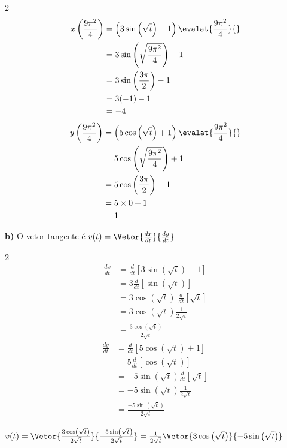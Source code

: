\documentclass[a4paper,12pt,fleqn]{article}
\begin{document}
\begin{answer}
\begin{multicols}{2}
\begin{align*}
  x\left(\frac{9\pi^2}{4}\right)
  & = \left(3 \sin\left(\sqrt{t}\right) - 1\right) \evalat{\frac{9\pi^2}{4}}{} \\
  & = 3 \sin\left(\sqrt{\frac{9\pi^2}{4}}\right) - 1  \\
  & = 3 \sin\left(\frac{3\pi}{2}\right) - 1  \\
  & = 3 (-1) - 1  \\
  & = -4
\end{align*}
\newcolumn
\begin{align*}
  y\left(\frac{9\pi^2}{4}\right)
  & = \left(5 \cos\left(\sqrt{t}\right) + 1\right) \evalat{\frac{9\pi^2}{4}}{} \\
  & = 5 \cos\left(\sqrt{\frac{9\pi^2}{4}}\right) + 1 \\
  & = 5 \cos\left(\frac{3\pi}{2}\right) + 1 \\
  & = 5 \times 0 + 1 \\
  & = 1
\end{align*}
\end{multicols}


\textbf{b)} \quad
O vetor tangente é
\(
  v(t) = \Vetor{\frac{dx}{dt}}{\frac{dy}{dt}}
\)

\begin{multicols}{2}
\begin{align*}
  \frac{dx}{dt}
  & = \frac{d}{dt}\left[3 \sin\left(\sqrt{t}\right) - 1\right] \\[2mm]
  & = 3 \frac{d}{dt}\left[\sin\left(\sqrt{t}\right)\right] \\[2mm]
  & = 3 \cos\left(\sqrt{t}\right)\;\frac{d}{dt}\left[\sqrt{t}\right] \\[2mm]
  & = 3 \cos\left(\sqrt{t}\right)\frac{1}{2\sqrt{t}} \\[2mm]
  & = \frac{3 \cos\left(\sqrt{t}\right)}{2\sqrt{t}}
\end{align*}
\newcolumn
\begin{align*}
  \frac{dy}{dt}
  & = \frac{d}{dt}\left[5 \cos\left(\sqrt{t}\right) + 1\right]   \\[2mm]
  & = 5\frac{d}{dt}\left[\cos\left(\sqrt{t}\right)\right]   \\[2mm]
  & = -5\sin\left(\sqrt{t}\right)\frac{d}{dt}\left[\sqrt{t}\right]   \\[2mm]
  & = -5\sin\left(\sqrt{t}\right)\frac{1}{2\sqrt{t}} \\[2mm]
  & = \frac{-5\sin\left(\sqrt{t}\right)}{2\sqrt{t}}
\end{align*}
\end{multicols}
\(
  v(t)
  = \Vetor%
    {\frac{3 \cos\left(\sqrt{t}\right)}{2\sqrt{t}}}
    {\frac{-5\sin\left(\sqrt{t}\right)}{2\sqrt{t}}}
  = \frac{1}{2\sqrt{t}}\Vetor%
    { 3\cos\left(\sqrt{t}\right)}
    {-5\sin\left(\sqrt{t}\right)}
\)


\end{answer}
\end{document}
